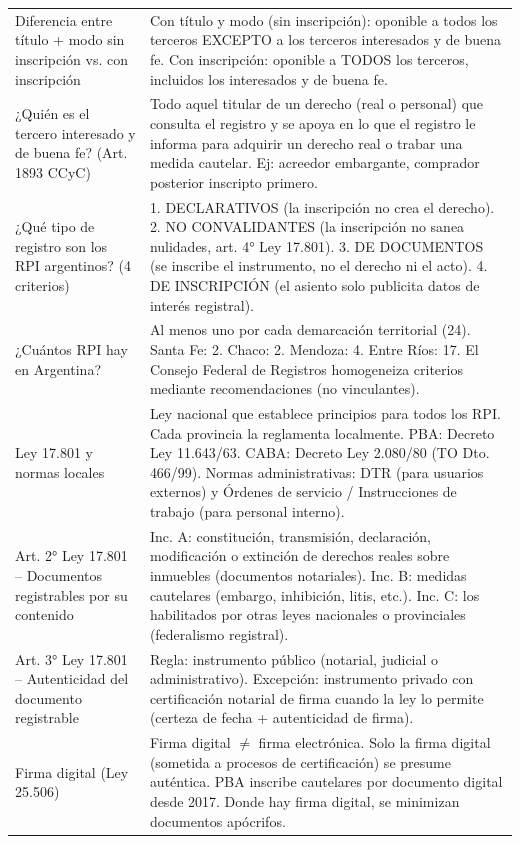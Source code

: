 \documentclass[12pt,oneside]{book}
\begin{document}
\begin{longtable}{p{} p{}}
Diferencia entre título + modo sin inscripción vs. con inscripción &
Con título y modo (sin inscripción): oponible a todos los terceros EXCEPTO a los terceros interesados y de buena fe. Con inscripción: oponible a TODOS los terceros, incluidos los interesados y de buena fe. \\

¿Quién es el tercero interesado y de buena fe? (Art. 1893 CCyC) &
Todo aquel titular de un derecho (real o personal) que consulta el registro y se apoya en lo que el registro le informa para adquirir un derecho real o trabar una medida cautelar. Ej: acreedor embargante, comprador posterior inscripto primero. \\

¿Qué tipo de registro son los RPI argentinos? (4 criterios) &
1. DECLARATIVOS (la inscripción no crea el derecho). 2. NO CONVALIDANTES (la inscripción no sanea nulidades, art. 4° Ley 17.801). 3. DE DOCUMENTOS (se inscribe el instrumento, no el derecho ni el acto). 4. DE INSCRIPCIÓN (el asiento solo publicita datos de interés registral). \\

¿Cuántos RPI hay en Argentina? &
Al menos uno por cada demarcación territorial (24). Santa Fe: 2. Chaco: 2. Mendoza: 4. Entre Ríos: 17. El Consejo Federal de Registros homogeneiza criterios mediante recomendaciones (no vinculantes). \\

Ley 17.801 y normas locales &
Ley nacional que establece principios para todos los RPI. Cada provincia la reglamenta localmente. PBA: Decreto Ley 11.643/63. CABA: Decreto Ley 2.080/80 (TO Dto. 466/99). Normas administrativas: DTR (para usuarios externos) y Órdenes de servicio / Instrucciones de trabajo (para personal interno). \\

Art. 2° Ley 17.801 -- Documentos registrables por su contenido &
Inc. A: constitución, transmisión, declaración, modificación o extinción de derechos reales sobre inmuebles (documentos notariales). Inc. B: medidas cautelares (embargo, inhibición, litis, etc.). Inc. C: los habilitados por otras leyes nacionales o provinciales (federalismo registral). \\

Art. 3° Ley 17.801 -- Autenticidad del documento registrable &
Regla: instrumento público (notarial, judicial o administrativo). Excepción: instrumento privado con certificación notarial de firma cuando la ley lo permite (certeza de fecha + autenticidad de firma). \\

Firma digital (Ley 25.506) &
Firma digital $\neq$ firma electrónica. Solo la firma digital (sometida a procesos de certificación) se presume auténtica. PBA inscribe cautelares por documento digital desde 2017. Donde hay firma digital, se minimizan documentos apócrifos. \\

\end{longtable}
\end{document}
